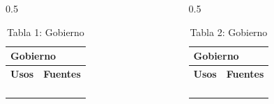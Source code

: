 \documentclass[
  ignorenonframetext,
]{beamer}
\begin{document}
\begin{frame}{}
\label{section}
\begin{columns}
    \begin{column}{0.5\textwidth}
        \begin{table}
            \centering
            \caption{Tabla 1: Gobierno}
            \begin{tabular}{ll}
                \multicolumn{2}{l}{Gobierno}                          \\ \hline
                \multicolumn{1}{l|}{\textbf{Usos}} & \textbf{Fuentes} \\ \hline
                \multicolumn{1}{l|}{}              &                  \\ \hline
                \multicolumn{1}{l|}{}              &                  \\ \hline
                \multicolumn{1}{l|}{}              &                  \\ \hline
                \multicolumn{1}{l|}{}              &                  \\ \hline
            \end{tabular}
        \end{table}
    \end{column}

    \begin{column}{0.5\textwidth}
        \begin{table}
            \centering
            \caption{Tabla 2: Gobierno}
            \begin{tabular}{ll}
                \multicolumn{2}{l}{Gobierno}                          \\ \hline
                \multicolumn{1}{l|}{\textbf{Usos}} & \textbf{Fuentes} \\ \hline
                \multicolumn{1}{l|}{}              &                  \\ \hline
                \multicolumn{1}{l|}{}              &                  \\ \hline
                \multicolumn{1}{l|}{}              &                  \\ \hline
                \multicolumn{1}{l|}{}              &                  \\ \hline
            \end{tabular}
        \end{table}
    \end{column}
\end{columns}

\end{frame}
\end{document}
